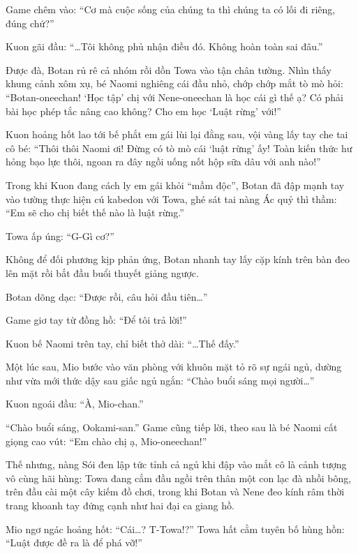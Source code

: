 \documentclass[../main.tex]{subfiles}
\begin{document}

Game chêm vào: ``Cơ mà cuộc sống của chúng ta thì chúng ta có lối đi riêng, đúng chứ?''

Kuon gãi đầu: ``\dots Tôi không phủ nhận điều đó. Không hoàn toàn sai đâu.''

Được đà, Botan rủ rê cả nhóm rồi dồn Towa vào tận chân tường. Nhìn thấy khung cảnh xôm xụ, bé Naomi nghiêng cái đầu nhỏ, chớp chớp mắt tò mò hỏi: ``Botan-oneechan! `Học tập' chị với Nene-oneechan là học cái gì thế ạ? Có phải bài học phép tắc nâng cao không? Cho em học `Luật rừng' với!''

Kuon hoảng hốt lao tới bế phắt em gái lùi lại đằng sau, vội vàng lấy tay che tai cô bé: ``Thôi thôi Naomi ơi! Đừng có tò mò cái `luật rừng' ấy! Toàn kiến thức hư hỏng bạo lực thôi, ngoan ra đây ngồi uống nốt hộp sữa dâu với anh nào!''

Trong khi Kuon đang cách ly em gái khỏi ``mầm độc'', Botan đã đập mạnh tay vào tường thực hiện cú kabedon với Towa, ghé sát tai nàng Ác quỷ thì thầm: ``Em sẽ cho chị biết thế nào là luật rừng.''

Towa ấp úng: ``G-Gì cơ?''

Không để đối phương kịp phản ứng, Botan nhanh tay lấy cặp kính trên bàn đeo lên mặt rồi bắt đầu buổi thuyết giảng ngược.


Botan dõng dạc: ``Được rồi, câu hỏi đầu tiên\dots''

Game giơ tay từ đồng hồ: ``Để tôi trả lời!''

Kuon bế Naomi trên tay, chỉ biết thở dài: ``\dots Thế đấy.''

\ct

Một lúc sau, Mio bước vào văn phòng với khuôn mặt tỏ rõ sự ngái ngủ, dường như vừa mới thức dậy sau giấc ngủ ngắn: ``Chào buổi sáng mọi người\dots''

Kuon ngoái đầu: ``À, Mio-chan.''

``Chào buổi sáng, Ookami-san.'' Game cũng tiếp lời, theo sau là bé Naomi cất giọng cao vút: ``Em chào chị ạ, Mio-oneechan!''

Thế nhưng, nàng Sói đen lập tức tỉnh cả ngủ khi đập vào mắt cô là cảnh tượng vô cùng hãi hùng: Towa đang cắm đầu ngồi trên thân một con lạc đà nhồi bông, trên đầu cài một cây kiếm đồ chơi, trong khi Botan và Nene đeo kính râm thời trang khoanh tay đứng cạnh như hai đại ca giang hồ.


Mio ngơ ngác hoảng hốt: ``Cái\dots? T-Towa!?'' Towa hất cằm tuyên bố hùng hồn: ``Luật được đề ra là để phá vỡ!''
\end{document}
